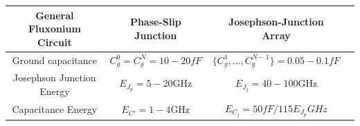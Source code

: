 \documentclass[%
reprint,
superscriptaddress,
 amsmath,amssymb,
 aps,
 prx,
longbibliography,
floatfix,
]{revtex4-2}
\begin{document}
\begin{table}[htb]
\begin{center}
\begin{tabular}{|c |c| c |c| }
 \hline
 \textbf{General Fluxonium Circuit} & \textbf{Phase-Slip Junction} & \textbf{Josephson-Junction Array}\\ 
 \hline
 Ground capacitance &$C_g^0=C_g^{N}= 10-20fF$ & $\{C_g^1,...,C_g^{N-1} \}= 0.05-0.1fF$\\ 
 \hline
 Josephson Junction Energy & $E_{J_p}=5-20$GHz & $E_{J_j}=40-100$GHz\\ 
 \hline
 Capacitance Energy &$E_{C'}=1-4$GHz&$E_{C_j}=50fF/115 E_{J_p} GHz$\\
 \hline
\end{tabular}
\end{center}


\end{table}
\end{document}
